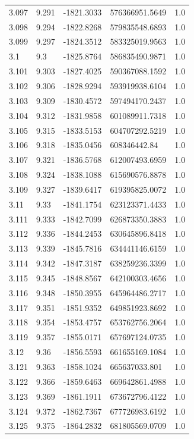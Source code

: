 \begin{tabular}{lllll}
3.097 & 9.291 & -1821.3033 & 576366951.5649 & 1.0 \\
3.098 & 9.294 & -1822.8268 & 579835548.6893 & 1.0 \\
3.099 & 9.297 & -1824.3512 & 583325019.9563 & 1.0 \\
3.1 & 9.3 & -1825.8764 & 586835490.9871 & 1.0 \\
3.101 & 9.303 & -1827.4025 & 590367088.1592 & 1.0 \\
3.102 & 9.306 & -1828.9294 & 593919938.6104 & 1.0 \\
3.103 & 9.309 & -1830.4572 & 597494170.2437 & 1.0 \\
3.104 & 9.312 & -1831.9858 & 601089911.7318 & 1.0 \\
3.105 & 9.315 & -1833.5153 & 604707292.5219 & 1.0 \\
3.106 & 9.318 & -1835.0456 & 608346442.84 & 1.0 \\
3.107 & 9.321 & -1836.5768 & 612007493.6959 & 1.0 \\
3.108 & 9.324 & -1838.1088 & 615690576.8878 & 1.0 \\
3.109 & 9.327 & -1839.6417 & 619395825.0072 & 1.0 \\
3.11 & 9.33 & -1841.1754 & 623123371.4433 & 1.0 \\
3.111 & 9.333 & -1842.7099 & 626873350.3883 & 1.0 \\
3.112 & 9.336 & -1844.2453 & 630645896.8418 & 1.0 \\
3.113 & 9.339 & -1845.7816 & 634441146.6159 & 1.0 \\
3.114 & 9.342 & -1847.3187 & 638259236.3399 & 1.0 \\
3.115 & 9.345 & -1848.8567 & 642100303.4656 & 1.0 \\
3.116 & 9.348 & -1850.3955 & 645964486.2717 & 1.0 \\
3.117 & 9.351 & -1851.9352 & 649851923.8692 & 1.0 \\
3.118 & 9.354 & -1853.4757 & 653762756.2064 & 1.0 \\
3.119 & 9.357 & -1855.0171 & 657697124.0735 & 1.0 \\
3.12 & 9.36 & -1856.5593 & 661655169.1084 & 1.0 \\
3.121 & 9.363 & -1858.1024 & 665637033.801 & 1.0 \\
3.122 & 9.366 & -1859.6463 & 669642861.4988 & 1.0 \\
3.123 & 9.369 & -1861.1911 & 673672796.4122 & 1.0 \\
3.124 & 9.372 & -1862.7367 & 677726983.6192 & 1.0 \\
3.125 & 9.375 & -1864.2832 & 681805569.0709 & 1.0 \\

\end{tabular}
